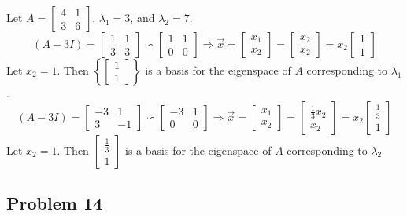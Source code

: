 \documentclass{article}%
\begin{document}
Let $A =
\begin{bmatrix}
    4 & 1 \\
    3 & 6
\end{bmatrix}$, ${\lambda}_1 = 3$, and ${\lambda}_2 = 7$.
$$
(A - 3I) =
\begin{bmatrix}
    1 & 1 \\
    3 & 3
\end{bmatrix}
\backsim
\begin{bmatrix}
    1 & 1 \\
    0 & 0
\end{bmatrix} \Rightarrow
\vec{x} =
\begin{bmatrix}
    x_1 \\ x_2
\end{bmatrix}
=
\begin{bmatrix}
    x_2 \\ x_2
\end{bmatrix}
=
x_2
\begin{bmatrix}
    1 \\ 1
\end{bmatrix}
$$
Let $x_2 = 1$. Then $\left\{\begin{bmatrix} 1 \\ 1 \end{bmatrix}\right\}$ is a basis for the eigenspace of $A$ corresponding to $\lambda_1$.
$$
(A - 3I) =
\begin{bmatrix}
    -3 & 1 \\
    3 & -1
\end{bmatrix}
\backsim
\begin{bmatrix}
    -3 & 1 \\
    0 & 0
\end{bmatrix} \Rightarrow
\vec{x} =
\begin{bmatrix}
    x_1 \\ x_2
\end{bmatrix}
=
\begin{bmatrix}
    \frac{1}{3}x_2 \\ x_2
\end{bmatrix}
=
x_2
\begin{bmatrix}
    \frac{1}{3} \\ 1
\end{bmatrix}
$$
Let $x_2 = 1$. Then $\begin{bmatrix} \frac{1}{3} \\ 1 \end{bmatrix}$ is a basis for the eigenspace of $A$ corresponding to $\lambda_2$

\subsection*{Problem 14}
\end{document}
